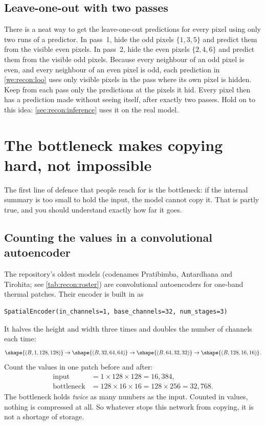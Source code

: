 \subsection{Leave-one-out with two passes}\label{sec:recon:twopass1d}

There is a neat way to get the leave-one-out predictions for every pixel using only two runs of a
predictor. In pass~1, hide the odd pixels $\{1,3,5\}$ and predict them from the visible even pixels.
In pass~2, hide the even pixels $\{2,4,6\}$ and predict them from the visible odd pixels. Because
every neighbour of an odd pixel is even, and every neighbour of an even pixel is odd, each prediction
in \cref{we:recon:loo} uses only visible pixels in the pass where its own pixel is hidden. Keep from
each pass only the predictions at the pixels it hid. Every pixel then has a prediction made without
seeing itself, after exactly two passes. Hold on to this idea: \cref{sec:recon:inference} uses it on
the real model.

\section{The bottleneck makes copying hard, not impossible}\label{sec:recon:bottleneck}

The first line of defence that people reach for is the bottleneck: if the internal summary is too
small to hold the input, the model cannot copy it. That is partly true, and you should understand
exactly how far it goes.

\subsection{Counting the values in a convolutional autoencoder}

The repository's oldest models (codenames Pratibimba, Antardhana and Tirohita; see
\cref{tab:recon:roster}) are convolutional autoencoders for one-band thermal patches. Their encoder
is built in  as
\begin{lstlisting}
SpatialEncoder(in_channels=1, base_channels=32, num_stages=3)
\end{lstlisting}
It halves the height and width three times and doubles the number of channels each time:
\[
\shape{(B, 1, 128, 128)} \to \shape{(B, 32, 64, 64)} \to \shape{(B, 64, 32, 32)}
\to \shape{(B, 128, 16, 16)}.
\]
Count the values in one patch before and after:
\begin{align*}
\text{input} &= 1 \times 128 \times 128 = 16{,}384,\\
\text{bottleneck} &= 128 \times 16 \times 16 = 128 \times 256 = 32{,}768.
\end{align*}
The bottleneck holds \emph{twice} as many numbers as the input. Counted in values, nothing is
compressed at all. So whatever stops this network from copying, it is not a shortage of storage.

